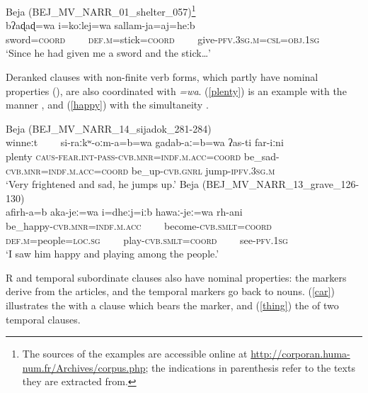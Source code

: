 \documentclass[output=paper]{langsci/langscibook}
\begin{document}
\ea \label{sword}
{Beja (BEJ\_MV\_NARR\_01\_shelter\_057)\footnote{The sources of the examples are accessible online at \url{http://corporan.huma-num.fr/Archives/corpus.php}; the indications in parenthesis refer to the texts they are extracted from.}}\\
\gll bʔaɖaɖ=wa i=koːlej=wa sallam-ja=aj=heːb\\
     sword=\textsc{coord}~~~~ \textsc{def.m}=stick=\textsc{coord}~~~~ give-\textsc{pfv.3sg.m=csl=obj.1sg}\\
\glt `Since he had given me a sword and the stick…'
\z

Deranked clauses with non-finite verb forms, which partly have nominal properties (\citealt{Vanhove2016}), are also coordinated with \textit{=wa}. (\ref{plenty}) is an example with the manner , and (\ref{happy}) with the simultaneity . 

\ea\label{plenty}
{Beja (BEJ\_MV\_NARR\_14\_sijadok\_281-284)}\\
\gll winneːt~~~~ si-raːkʷ-oːm-a=b=wa gadab-aː=b=wa  ʔas-ti far-iːni\\
     plenty \textsc{caus}{}-\textsc{\textup{fear}}.\textsc{int-pass-cvb.mnr=indf.m.acc=coord} be\_sad-\textsc{cvb.mnr=indf.m.acc=coord} be\_up-\textsc{cvb.gnrl} jump-\textsc{ipfv.3sg.m}\\
\glt `Very frightened and sad, he jumps up.'
\ex\label{happy}
{Beja (BEJ\_MV\_NARR\_13\_grave\_126-130)}\\
\gll afirh-a=b aka-jeː=wa i=dheːj=iːb hawaː-jeː=wa rh-ani\\
     be\_happy-\textsc{cvb.mnr=indf.m.acc}~~~~ become-\textsc{cvb.smlt=coord} \textsc{def.m}=people=\textsc{loc.sg}~~~~ play-\textsc{cvb.smlt=coord}~~~~ see-\textsc{pfv.1sg}\\
\glt `I saw him happy and playing among the people.'
\z

{R and temporal subordinate clauses also have nominal properties: the  markers derive from the articles, and the temporal markers go back to nouns. (\ref{car}) illustrates the  with a  clause which bears the} { marker, and (\ref{thing}) the  of two temporal clauses.}
\end{document}
